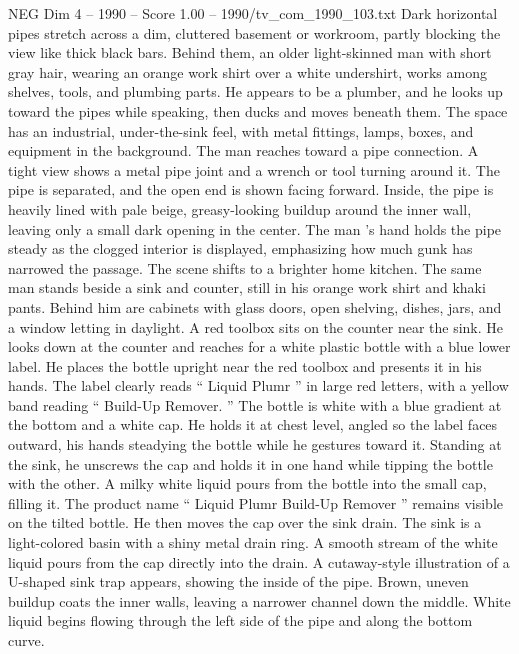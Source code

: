 \begin{textsample}{NEG Dim 4 – 1990 – Score 1.00 – 1990/tv\_com\_1990\_103.txt}  \label{ex:f4_neg_030}
Dark horizontal pipes stretch across a dim, cluttered basement or workroom, partly blocking the view like thick black bars.
Behind them, an older light-skinned man with short gray hair, wearing an orange work shirt over a white undershirt, works among shelves, tools, and plumbing parts.
He appears to be a plumber, and he looks up toward the pipes while speaking, then ducks and moves beneath them.
The space has an industrial, under-the-sink feel, with metal fittings, lamps, boxes, and equipment in the background.
The man reaches toward a pipe connection.
A tight view shows a metal pipe joint and a wrench or tool turning around it.
The pipe is separated, and the open end is shown facing forward.
Inside, the pipe is heavily lined with pale beige, greasy-looking buildup around the inner wall, leaving only a small dark opening in the center.
The man ’s hand holds the pipe steady as the clogged interior is displayed, emphasizing how much gunk has narrowed the passage.
The scene shifts to a brighter home kitchen.
The same man stands beside a sink and counter, still in his orange work shirt and khaki pants.
Behind him are cabinets with glass doors, open shelving, dishes, jars, and a window letting in daylight.
A red toolbox sits on the counter near the sink.
He looks down at the counter and reaches for a white plastic bottle with a blue lower label.
He places the bottle upright near the red toolbox and presents it in his hands.
The label clearly reads “ Liquid Plumr ” in large red letters, with a yellow band reading “ Build-Up Remover. ” The bottle is white with a blue gradient at the bottom and a white cap.
He holds it at chest level, angled so the label faces outward, his hands steadying the bottle while he gestures toward it.
Standing at the sink, he unscrews the cap and holds it in one hand while tipping the bottle with the other.
A milky white liquid pours from the bottle into the small cap, filling it.
The product name “ Liquid Plumr Build-Up Remover ” remains visible on the tilted bottle.
He then moves the cap over the sink drain.
The sink is a light-colored basin with a shiny metal drain ring.
A smooth stream of the white liquid pours from the cap directly into the drain.
A cutaway-style illustration of a U-shaped sink trap appears, showing the inside of the pipe.
Brown, uneven buildup coats the inner walls, leaving a narrower channel down the middle.
White liquid begins flowing through the left side of the pipe and along the bottom curve.

\end{textsample}
